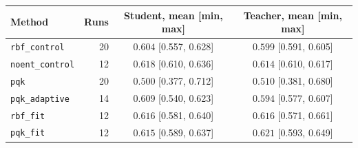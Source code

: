 \begin{tabular}{@{}lrcc@{}}
\toprule
Method & Runs & Student, mean [min, max] & Teacher, mean [min, max] \\
\midrule
\texttt{rbf\_control} & 20 & $0.604$ [0.557, 0.628] & $0.599$ [0.591, 0.605] \\
\texttt{noent\_control} & 12 & $0.618$ [0.610, 0.636] & $0.614$ [0.610, 0.617] \\
\texttt{pqk} & 20 & $0.500$ [0.377, 0.712] & $0.510$ [0.381, 0.680] \\
\texttt{pqk\_adaptive} & 14 & $0.609$ [0.540, 0.623] & $0.594$ [0.577, 0.607] \\
\texttt{rbf\_fit} & 12 & $0.616$ [0.581, 0.640] & $0.616$ [0.571, 0.661] \\
\texttt{pqk\_fit} & 12 & $0.615$ [0.589, 0.637] & $0.621$ [0.593, 0.649] \\
\bottomrule
\end{tabular}

